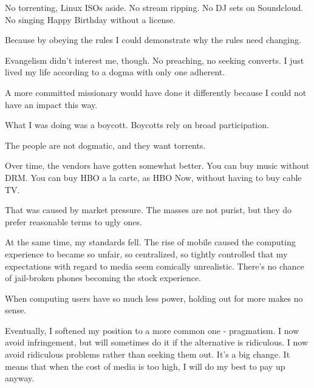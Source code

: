 No torrenting, Linux ISOs aside. No stream ripping. No DJ sets on
Soundcloud. No singing Happy Birthday without a license.

Because by obeying the rules I could demonstrate why the rules need
changing.

Evangelism didn't interest me, though. No preaching, no seeking
converts. I just lived my life according to a dogma with only one
adherent.

A more committed missionary would have done it differently because I
could not have an impact this way.

What I was doing was a boycott. Boycotts rely on broad participation.

The people are not dogmatic, and they want torrents.

Over time, the vendors have gotten somewhat better. You can buy music
without DRM. You can buy HBO a la carte, as HBO Now, without having to
buy cable TV.

That was caused by market pressure. The masses are not purist, but they
do prefer reasonable terms to ugly ones.

At the same time, my standards fell. The rise of mobile caused the
computing experience to became so unfair, so centralized, so tightly
controlled that my expectations with regard to media seem comically
unrealistic. There's no chance of jail-broken phones becoming the stock
experience.

When computing users have so much less power, holding out for more makes
no sense.

Eventually, I softened my position to a more common one - pragmatism. I
now avoid infringement, but will sometimes do it if the alternative is
ridiculous. I now avoid ridiculous problems rather than seeking them
out. It's a big change. It means that when the cost of media is too
high, I will do my best to pay up anyway.
